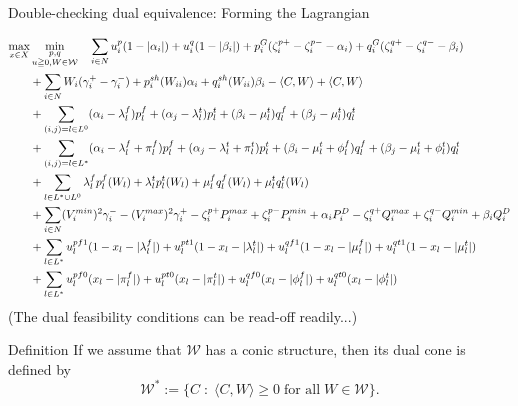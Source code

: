 \documentclass[xcolor=dvipsnames]{beamer}
\newcommand{\ii}{i}
\newcommand{\WW}{W}
\newcommand{\WSet}{\mathcal{W}}
\begin{document}
\begin{frame}{Double-checking dual equivalence: Forming the Lagrangian}
\begin{tiny}
\begin{subequations}
\begin{align}
\max_{x \in X} &\min_{\substack{p,q\\ u \geqq 0,W \in \WSet}} \quad 
  \sum_{i \in N} u_i^{p}(1-|\alpha_{\ii}|) +  u_i^{q}(1-|\beta_{\ii}|) + p_\ii^G(\zeta_\ii^{p+}-\zeta_\ii^{p-} - \alpha_\ii) + q_\ii^G(\zeta_\ii^{q+}-\zeta_\ii^{q-} - \beta_\ii)\notag \\
  &+\sum_{\ii \in N} W_\ii(\gamma_{\ii}^+-\gamma_{\ii}^-) +p_\ii^{sh}(\WW_{ii})\alpha_\ii + q_\ii^{sh}(\WW_{ii})\beta_\ii - \langle C , \WW \rangle + \langle C, W \rangle \notag\\
&+\sum_{(i,j)=l \in L^0} (\alpha_i - \lambda_l^f) p_l^f + (\alpha_j - \lambda_l^t) p_l^t 
+ (\beta_i - \mu_l^t) q_l^f + (\beta_j -\mu_l^t) q_l^t\notag\\
&+\sum_{(i,j)=l \in L^*} (\alpha_i - \lambda_l^f + \pi_l^f) p_l^f + (\alpha_j - \lambda_l^t + \pi_l^t) p_l^t 
+ (\beta_i - \mu_l^t + \phi_l^f) q_l^f + (\beta_j -\mu_l^t + \phi_l^t) q_l^t\notag\\
&+\sum_{l \in L^* \cup L^0} \lambda_l^f p_l^f(\WW_l) + \lambda_l^t p_l^t(\WW_l) + \mu_l^f q_l^f(\WW_l) + \mu_l^t q_l^t(\WW_l) \notag\\
  &+\sum_{\ii \in N}  (V_\ii^{min})^2 \gamma_\ii^- - (V_\ii^{max})^2 \gamma_\ii^+ 
- \zeta_\ii^{p+}P_\ii^{max} + \zeta_\ii^{p-}P_\ii^{min} + \alpha_\ii P_\ii^D 
- \zeta_\ii^{q+}Q_\ii^{max} + \zeta_\ii^{q-}Q_\ii^{min} + \beta_\ii Q_\ii^D \notag \\
& + \sum_{l \in L^* } u_l^{pf1}(1 -x_l  - |\lambda_l^f|) + u_l^{pt1}(1 - x_l - |\lambda_l^t|) + u_l^{qf1}(1 - x_l - |\mu_l^f|) + u_l^{qt1}(1 - x_l - |\mu_l^t|) \notag \\
& + \sum_{l \in L^* } u_l^{pf0}(x_l  - |\pi_l^f|) + u_l^{pt0}(x_l - |\pi_l^t|) + u_l^{qf0}(x_l - |\phi_l^f|) + u_l^{qt0}(x_l - |\phi_l^t|) \notag
\end{align}
\end{subequations}
(The dual feasibility conditions can be read-off readily...)
\end{tiny}
\end{frame}

\begin{frame}{Definition}
If we assume that $\WSet$ has a conic structure, then its dual cone is defined by
$$\WSet^* := \{ C \; : \; \langle C, \WW \rangle \ge 0\; \text{for all}\; \WW \in \WSet \}.$$
\end{frame}
\end{document}
